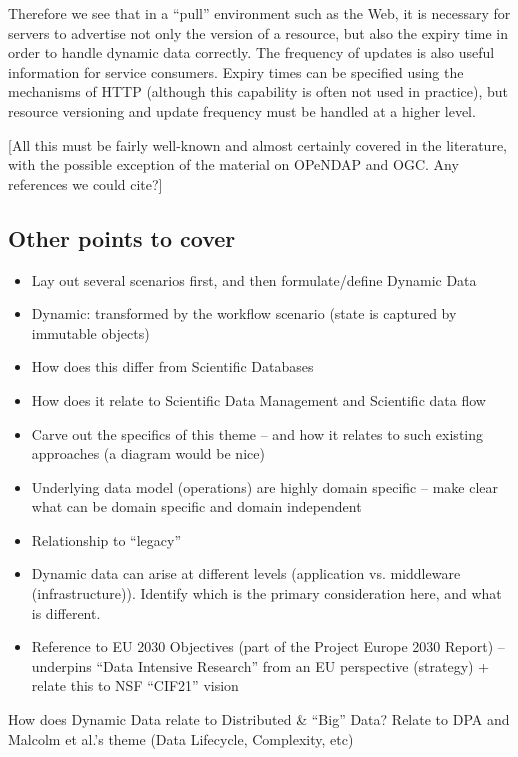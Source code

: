 \documentclass[preprint,12pt]{article}
\begin{document}
Therefore we see that in a ``pull'' environment such as the Web, it is
necessary for servers to advertise not only the version of a resource,
but also the expiry time in order to handle dynamic data correctly.
The frequency of updates is also useful information for service
consumers.  Expiry times can be specified using the mechanisms of HTTP
(although this capability is often not used in practice), but resource
versioning and update frequency must be handled at a higher level.

[All this must be fairly well-known and almost certainly covered in
the literature, with the possible exception of the material on OPeNDAP
and OGC.  Any references we could cite?]

\subsection{Other points to cover}

\begin{itemize}
\item Lay out several scenarios first, and then formulate/define Dynamic Data
\item Dynamic: transformed by the workflow scenario (state is captured by immutable objects)
\item How does this differ from Scientific Databases
\item How does it relate to Scientific Data Management and Scientific data flow
\item Carve out the specifics of this theme -- and how it relates to such existing approaches (a diagram would be nice)
\item Underlying data model (operations) are highly domain specific -- make clear what can be domain specific and domain independent
\item Relationship to ``legacy''
\item Dynamic data can arise at different levels (application vs. middleware (infrastructure)). Identify which is the primary consideration here, and what is different.
\item Reference to EU 2030 Objectives (part of the Project Europe 2030
  Report) -- underpins ``Data Intensive Research'' from an EU
  perspective (strategy) + relate this to NSF ``CIF21'' vision
\end{itemize}

How does Dynamic Data relate to Distributed \& ``Big'' Data? Relate to
DPA and Malcolm et al.'s theme (Data Lifecycle, Complexity, etc)
\end{document}
